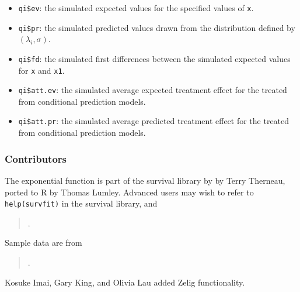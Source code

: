 \begin{itemize}
   \begin{itemize}
   \item {\tt qi\$ev}: the simulated expected values for the specified
     values of {\tt x}.
   \item {\tt qi\$pr}: the simulated predicted values drawn from the
     distribution defined by $(\lambda_i, \sigma)$.
   \item {\tt qi\$fd}: the simulated first differences between the
     simulated expected values for {\tt x} and {\tt x1}.
   \item {\tt qi\$att.ev}: the simulated average expected treatment
     effect for the treated from conditional prediction models.  
   \item {\tt qi\$att.pr}: the simulated average predicted treatment
     effect for the treated from conditional prediction models.  
   \end{itemize}
\end{itemize}

\subsubsection{Contributors}

The exponential function is part of the survival library by by Terry
Therneau, ported to R by Thomas Lumley. Advanced users may wish to
refer to \texttt{help(survfit)} in the survival library, and
\begin{verse}
.
\end{verse}

Sample data are from 
\begin{verse}
.  
\end{verse}

Kosuke Imai, Gary King, and Olivia Lau added Zelig functionality. 








